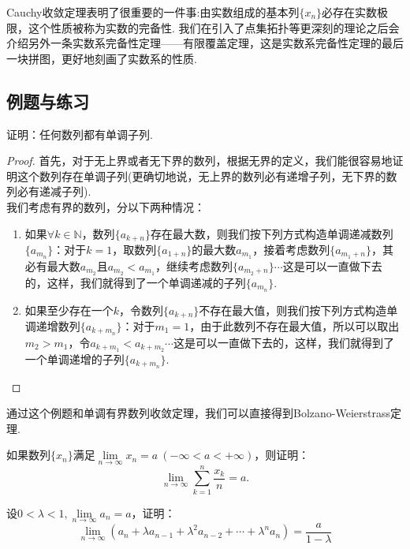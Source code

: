	Cauchy收敛定理表明了很重要的一件事:由实数组成的基本列$\{x_n\}$必存在实数极限，这个性质被称为实数的完备性.
	我们在引入了点集拓扑等更深刻的理论之后会介绍另外一条实数系完备性定理——有限覆盖定理，这是实数系完备性定理的最后一块拼图，更好地刻画了实数系的性质.\par
	\begin{theorem}[压缩映射定理]
		
	\end{theorem}

	\subsection{例题与练习}
	\begin{example}
		证明：任何数列都有单调子列.
	\end{example}
	\begin{proof}
		首先，对于无上界或者无下界的数列，根据无界的定义，我们能很容易地证明这个数列存在单调子列(更确切地说，无上界的数列必有递增子列，无下界的数列必有递减子列).\\
		我们考虑有界的数列，分以下两种情况：
		\begin{enumerate}
			\item 如果$\forall k\in\mathbb{N}$，数列$\{a_{k+n}\}$存在最大数，则我们按下列方式构造单调递减数列$\{a_{m_n}\}$：对于$k=1$，取数列$\{a_{1+n}\}$的最大数$a_{m_1}$，接着考虑数列$\{a_{m_1+n}\}$，其必有最大数$a_{m_2}$且$a_{m_2}<a_{m_1}$，继续考虑数列$\{a_{m_2+n}\}\cdots$这是可以一直做下去的，这样，我们就得到了一个单调递减的子列$\{a_{m_n}\}$.
			\item 如果至少存在一个$k$，令数列$\{a_{k+n}\}$不存在最大值，则我们按下列方式构造单调递增数列$\{a_{k+m_n}\}$：对于$m_1=1$，由于此数列不存在最大值，所以可以取出$m_2>m_1$，令$a_{k+m_1}<a_{k+m_2}\cdots$这是可以一直做下去的，这样，我们就得到了一个单调递增的子列$\{a_{k+m_n}\}$.
		\end{enumerate}
	\end{proof}

	通过这个例题和单调有界数列收敛定理，我们可以直接得到Bolzano-Weierstrass定理.
	\begin{example}
		如果数列$\{x_n\}$满足$\lim\limits_{n\rightarrow\infty}x_n=a \ (-\infty<a<+\infty)$，则证明：$$\lim\limits_{n\rightarrow\infty}\sum_{k=1}^{n}\frac{x_k}{n}=a.$$
	\end{example}
	\begin{example}
		设$0<\lambda<1,\lim\limits_{n\rightarrow\infty}a_n=a$，证明：$$\lim\limits_{n\rightarrow\infty}(a_n+\lambda a_{n-1}+\lambda^{2}a_{n-2}+\cdots+\lambda^{n}a_n)=\frac{a}{1-\lambda}$$
	\end{example}
	
